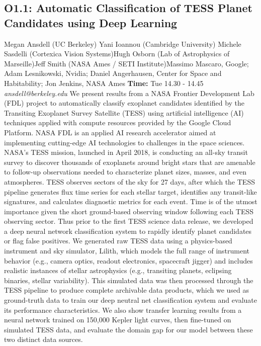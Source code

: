 \documentclass{report}
\begin{document}
\subsection*{O1.1: Automatic Classification of TESS Planet Candidates using Deep Learning}
\bigskip
Megan Ansdell (UC Berkeley) \newline Yani Ioannou (Cambridge University) \newline  Michele Sasdelli (Cortexica Vision Systems)\newline  Hugh Osborn (Lab of Astrophysics of Marseille)\newline Jeff Smith (NASA Ames / SETI Institute)\newline  Massimo Mascaro, Google; Adam Lesnikowski, Nvidia; Daniel Angerhausen, Center for Space and Habitability; Jon Jenkins, NASA Ames\newline\newline
{\bf Time:} Tue 14.30 - 14.45\newline
\newline
{\it ansdell@berkeley.edu}\newline
\newline\newline
We present results from a NASA Frontier Development Lab (FDL) project to automatically classify exoplanet candidates identified by the Transiting Exoplanet Survey Satellite (TESS) using artificial intelligence (AI) techniques applied with compute resources provided by the Google Cloud Platform. NASA FDL is an applied AI research accelerator aimed at implementing cutting-edge AI technologies to challenges in the space sciences. NASA's TESS mission, launched in April 2018, is conducting an all-sky transit survey to discover thousands of exoplanets around bright stars that are amenable to follow-up observations needed to characterize planet sizes, masses, and even atmospheres. TESS observes sectors of the sky for 27 days, after which the TESS pipeline generates flux time series for each stellar target, identifies any transit-like signatures, and calculates diagnostic metrics for each event. Time is of the utmost importance given the short ground-based observing window following each TESS observing sector. Thus prior to the first TESS science data release, we developed a deep neural network classification system to rapidly identify planet candidates or flag false positives. We generated raw TESS data using a physics-based instrument and sky simulator, Lilith, which models the full range of instrument behavior (e.g., camera optics, readout electronics, spacecraft jigger) and includes realistic instances of stellar astrophysics (e.g., transiting planets, eclipsing binaries, stellar variability). This simulated data was then processed through the TESS pipeline to produce complete archivable data products, which we used as ground-truth data to train our deep neutral net classification system and evaluate its performance characteristics. We also show transfer learning results from a neural network trained on 150,000 Kepler light curves, then fine-tuned on simulated TESS data, and evaluate the domain gap for our model between these two distinct data sources.\newline
\newpage
\end{document}
